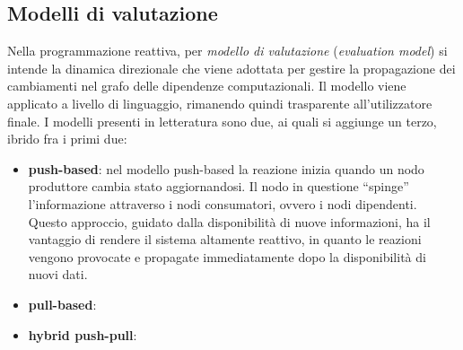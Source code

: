 \documentclass[12pt,a4paper,openright,twoside]{book}
\begin{document}
\subsection{Modelli di valutazione}
Nella programmazione reattiva, per \textit{modello di valutazione} (\textit{evaluation model}) si intende la dinamica direzionale che viene adottata per gestire la propagazione dei cambiamenti nel grafo delle dipendenze computazionali. 
Il modello viene applicato a livello di linguaggio, rimanendo quindi trasparente all'utilizzatore finale. 
I modelli presenti in letteratura sono due, ai quali si aggiunge un terzo, ibrido fra i primi due: 
\begin{itemize}
    \item \textbf{push-based}: nel modello push-based la reazione inizia quando un nodo produttore cambia stato aggiornandosi. Il nodo in questione ``spinge'' l'informazione attraverso i nodi consumatori, ovvero i nodi dipendenti. Questo approccio, guidato dalla disponibilità di nuove informazioni, ha il vantaggio di rendere il sistema altamente reattivo, in quanto le reazioni vengono provocate e propagate immediatamente dopo la disponibilità di nuovi dati.  
    \item \textbf{pull-based}: 
    \item \textbf{hybrid push-pull}: 
\end{itemize}
\end{document}
